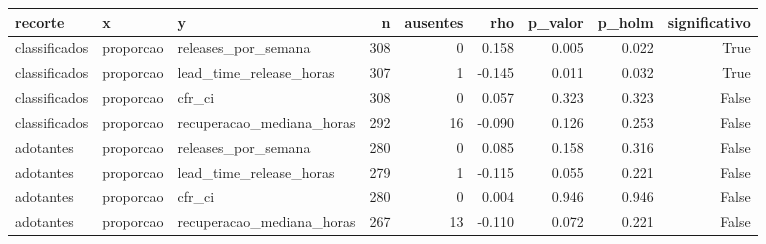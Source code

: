 \begin{tabular}{lllrrrrrr}
\toprule
recorte & x & y & n & ausentes & rho & p_valor & p_holm & significativo \\
\midrule
classificados & proporcao & releases_por_semana & 308 & 0 & 0.158 & 0.005 & 0.022 & True \\
classificados & proporcao & lead_time_release_horas & 307 & 1 & -0.145 & 0.011 & 0.032 & True \\
classificados & proporcao & cfr_ci & 308 & 0 & 0.057 & 0.323 & 0.323 & False \\
classificados & proporcao & recuperacao_mediana_horas & 292 & 16 & -0.090 & 0.126 & 0.253 & False \\
adotantes & proporcao & releases_por_semana & 280 & 0 & 0.085 & 0.158 & 0.316 & False \\
adotantes & proporcao & lead_time_release_horas & 279 & 1 & -0.115 & 0.055 & 0.221 & False \\
adotantes & proporcao & cfr_ci & 280 & 0 & 0.004 & 0.946 & 0.946 & False \\
adotantes & proporcao & recuperacao_mediana_horas & 267 & 13 & -0.110 & 0.072 & 0.221 & False \\
\bottomrule
\end{tabular}
